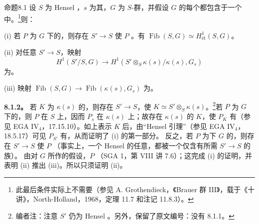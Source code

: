 \begin{SGAresult}{命题}{8.1}
设 $S$ 为 Hensel ，$s$ 为其，$G$ 为 $S$-群，并假设 $G$ 的每个都包含于一个中。\footnote{此最后条件实际上不需要（参见 A. Grothendieck，《Brauer 群 III》，载于《十讲》，North-Holland，1968，定理 11.7 和注记 11.8.3）。}则：

(i) 若 $P$ 为 $G$ 下的，则存在 $S'\to S$ 使 $P$ 。有 $\operatorname{Fib}(S,G)\simeq H^1_{\text{ét}}(S,G)$。

(ii) 对任意 $S'\to S$，映射
\[H^1(S'/S,G)\longrightarrow H^1(S'\otimes_S\kappa(s)/\kappa(s),G_s)\]
为。

(iii) 映射 $\operatorname{Fib}(S,G)\to\operatorname{Fib}(\kappa(s),G_s)$ 为。
\end{SGAresult}
\textbf{8.1.2。} 若 $K$ 为 $\kappa(s)$ 的，则存在 $S'\to S$，使 $K\simeq S'\otimes_S\kappa(s)$。\footnote{编者注：注意 $S'$ 仍为 Hensel 。另外，保留了原文编号：没有 8.1.1。}若 $P$ 为 $G$ 下的，则 $P$ 在 $S$ 上，因而 $P_s$ 在 $\kappa(s)$ 上；故存在 $\kappa(s)$ 的 $K$，使 $P_K$ 有（参见 EGA IV$_4$，17.15.10）。如上表示 $K$ 后，由“Hensel 引理”（参见 EGA IV$_4$，18.5.17）可见 $P_{S'}$ 有，从而证明了 (i) 的第一部分。
反之，若 $P$ 为下 $G$ 的，则存在 $S'\to S$ 使 $P$ （事实上，一个 Hensel 的任意，都被一个仅含有所需 $S'\to S$ 的族）。
由对 $G$ 所作的假设，$P$ （SGA 1，第 VIII 讲 7.6）；这完成 (i) 的证明，并表明 (ii) 推出 (iii)。所以只须证明 (ii)。


